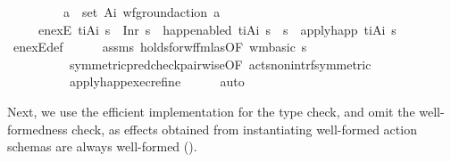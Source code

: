 \begin{isabellebody}
\ \ \ \ \ \ \ \ \ {\isachardoublequoteopen}{\isasymforall}a\ {\isasymin}\ set\ A\isactrlsub i{\isachardot}{\kern0pt}\ wf{\isacharunderscore}{\kern0pt}ground{\isacharunderscore}{\kern0pt}action\ a{\isachardoublequoteclose}\isanewline
\ \ \ \ \ {\isachardoublequoteopen}en{\isacharunderscore}{\kern0pt}exE\ {\isacharparenleft}{\kern0pt}t\isactrlsub i{\isacharcomma}{\kern0pt}A\isactrlsub i{\isacharparenright}{\kern0pt}\ s\ {\isacharequal}{\kern0pt}\ Inr\ s{\isacharprime}{\kern0pt}\ {\isasymlongleftrightarrow}\ happ{\isacharunderscore}{\kern0pt}enabled\ {\isacharparenleft}{\kern0pt}t\isactrlsub i{\isacharcomma}{\kern0pt}A\isactrlsub i{\isacharparenright}{\kern0pt}\ s\ {\isasymand}\ s{\isacharprime}{\kern0pt}\ {\isacharequal}{\kern0pt}\ apply{\isacharunderscore}{\kern0pt}happ\ {\isacharparenleft}{\kern0pt}t\isactrlsub i{\isacharcomma}{\kern0pt}A\isactrlsub i{\isacharparenright}{\kern0pt}\ s{\isachardoublequoteclose}\isanewline
%
\isadelimproof
\ \ \ \ %
\endisadelimproof
%
\isatagproof
{}\isamarkupfalse%
\ en{\isacharunderscore}{\kern0pt}exE{\isacharunderscore}{\kern0pt}def\isanewline
\ \ \ \ \isamarkupfalse%
\ assms\ holds{\isacharunderscore}{\kern0pt}for{\isacharunderscore}{\kern0pt}wf{\isacharunderscore}{\kern0pt}fmlas{\isacharbrackleft}{\kern0pt}OF\ {\isacartoucheopen}wm{\isacharunderscore}{\kern0pt}basic\ s{\isacartoucheclose}{\isacharbrackright}{\kern0pt}\ \ \isanewline
\ \ \ \ \ \ \ \ \ \ symmetric{\isacharunderscore}{\kern0pt}pred{\isacharunderscore}{\kern0pt}check{\isacharunderscore}{\kern0pt}pairwise{\isacharbrackleft}{\kern0pt}OF\ acts{\isacharunderscore}{\kern0pt}non{\isacharunderscore}{\kern0pt}intrf{\isacharunderscore}{\kern0pt}symmetric{\isacharbrackright}{\kern0pt}\isanewline
\ \ \ \ \ \ \ \ \ \ apply{\isacharunderscore}{\kern0pt}happ{\isacharunderscore}{\kern0pt}exec{\isacharunderscore}{\kern0pt}refine\isanewline
\ \ \ \ \isamarkupfalse%
\ auto%
\endisatagproof
{\isafoldproof}%
%
\isadelimproof
%
\endisadelimproof
%
\begin{isamarkuptext}%
Next, we use the efficient implementation 
    for the type check, and omit the well-formedness check, as effects obtained
    from instantiating well-formed action schemas are always well-formed
    ().%
\end{isamarkuptext}\isamarkuptrue%

\end{isabellebody}
